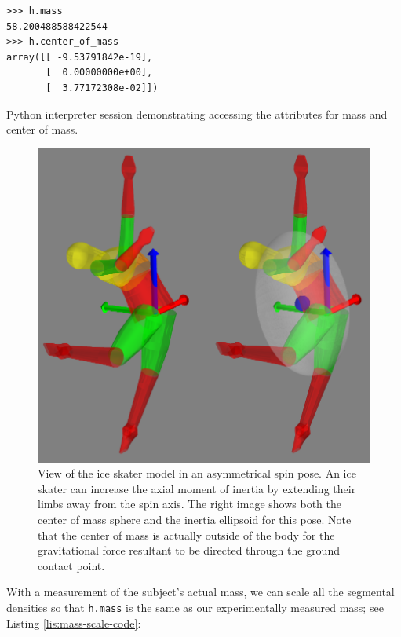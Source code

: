 \documentclass[10pt,a4paper,twocolumn]{article}
\begin{document}
\begin{listing*}
  \begin{verbatim}
>>> h.mass
58.200488588422544
>>> h.center_of_mass
array([[ -9.53791842e-19],
       [  0.00000000e+00],
       [  3.77172308e-02]])
  \end{verbatim}
  \caption{Python interpreter session demonstrating accessing the attributes
    for mass and center of mass.}
  \label{lis:mass-com-code}
\end{listing*}

\begin{figure}
  \begin{center}
    \includegraphics[width=\columnwidth]{figures/ice-skater-double.png}
  \end{center}
  \caption{View of the ice skater model in an asymmetrical spin pose. An ice
    skater can increase the axial moment of inertia by extending their limbs
    away from the spin axis. The right image shows both the center of mass
    sphere and the inertia ellipsoid for this pose. Note that the center of
    mass is actually outside of the body for the gravitational force resultant
    to be directed through the ground contact point.
  }
  \label{fig:iceskater}
\end{figure}

With a measurement of the subject's actual mass, we can scale all the segmental
densities so that \verb+h.mass+ is the same as our experimentally measured
mass; see Listing \ref{lis:mass-scale-code}:
\end{document}
